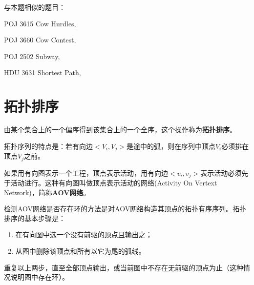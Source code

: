 与本题相似的题目：
\begindot
\item POJ 3615 Cow Hurdles, 
\item POJ 3660 Cow Contest, 
\item POJ 2502 Subway, 
\item HDU 3631 Shortest Path, 
\myenddot


\section{拓扑排序} %
由某个集合上的一个偏序得到该集合上的一个全序，这个操作称为\textbf{拓扑排序}。

拓扑序列的特点是：若有向边$<V_i, V_j>$是途中的弧，则在序列中顶点$V_i$必须排在顶点$V_j$之前。

如果用有向图表示一个工程，顶点表示活动，用有向边$<v_i,v_j>$表示活动必须先于活动进行。这种有向图叫做顶点表示活动的网络(Activity On Vertext Network)，简称\textbf{AOV网络}。

检测AOV网络是否存在环的方法是对AOV网络构造其顶点的拓扑有序序列。拓扑排序的基本步骤是：
\begin{enumerate}
\item 在有向图中选一个没有前驱的顶点且输出之；
\item 从图中删除该顶点和所有以它为尾的弧线。
\end{enumerate}
重复以上两步，直至全部顶点输出，或当前图中不存在无前驱的顶点为止（这种情况说明图中存在环）。

